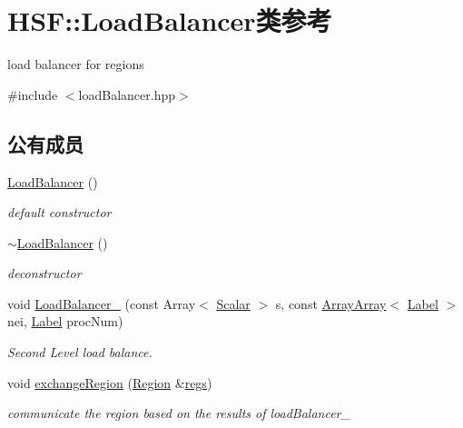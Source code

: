 \hypertarget{classHSF_1_1LoadBalancer}{
\section{HSF::LoadBalancer类参考}
\label{classHSF_1_1LoadBalancer}
}


load balancer for regions  


{\ttfamily \#include $<$loadBalancer.hpp$>$}\subsection*{公有成员}
\begin{DoxyCompactItemize}
\item 
\hyperlink{classHSF_1_1LoadBalancer_af9fd71150f3cd1b8c4f87023b916dedc}{LoadBalancer} ()
\begin{DoxyCompactList}\small\item\em default constructor \item\end{DoxyCompactList}\item 
\hyperlink{classHSF_1_1LoadBalancer_aa03846f31ea99f255b23adf0777cf373}{$\sim$LoadBalancer} ()
\begin{DoxyCompactList}\small\item\em deconstructor \item\end{DoxyCompactList}\item 
void \hyperlink{classHSF_1_1LoadBalancer_a06147f535aa0c290b332c9578d80d3fa}{LoadBalancer\_} (const Array$<$ \hyperlink{namespaceHSF_a7419497552ed1c5631a818b75eed1aec}{Scalar} $>$ s, const \hyperlink{classHSF_1_1ArrayArray}{ArrayArray}$<$ \hyperlink{namespaceHSF_ae65d72be782e989396ebe5ec6ae4c2b6}{Label} $>$ nei, \hyperlink{namespaceHSF_ae65d72be782e989396ebe5ec6ae4c2b6}{Label} procNum)
\begin{DoxyCompactList}\small\item\em Second Level load balance. \item\end{DoxyCompactList}\item 
void \hyperlink{classHSF_1_1LoadBalancer_aff34a6877828f65b92b9e146eaaced3b}{exchangeRegion} (\hyperlink{classHSF_1_1Region}{Region} \&\hyperlink{src_2interfaces_2interface_8hpp_aeb8610dbeef683c2abea70a1362a2d25}{regs})
\begin{DoxyCompactList}\small\item\em communicate the region based on the results of loadBalancer\_ \item\end{DoxyCompactList}\item 

\end{DoxyCompactItemize}
